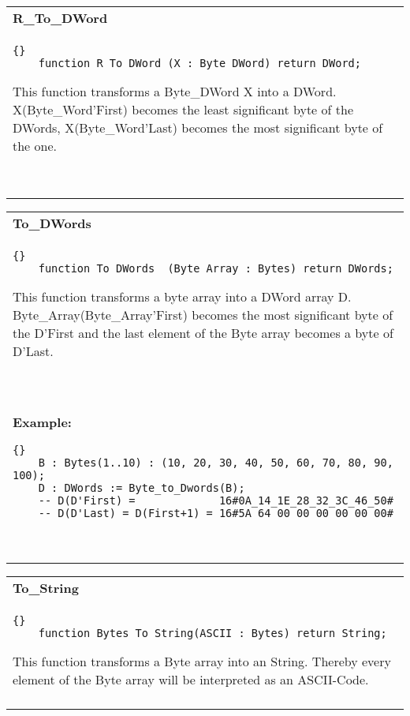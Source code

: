 \begin{tabular}{p{\textwidth}}   
\textbf{R\_To\_DWord}\ \\
  \begin{lstlisting}{}
    function R_To_DWord (X : Byte_DWord) return DWord;  
  \end{lstlisting}
  This function transforms a Byte\_DWord X into a DWord.
  X(Byte\_Word'First) becomes the least significant byte of the DWords,
  X(Byte\_Word'Last) becomes the most significant byte of the one.\\ \ \\
  \hline\\
\end{tabular}


\begin{tabular}{p{\textwidth}}
  \textbf{To\_DWords}\ \\
  \begin{lstlisting}{}
    function To_DWords  (Byte_Array : Bytes) return DWords;
  \end{lstlisting}
  This function transforms a byte array into a DWord array D.
  Byte\_Array(Byte\_Array'First) becomes the most significant byte
  of the D'First and the last element of the Byte array becomes a byte of
  D'Last. \\ \ \\
  \textbf{Example:}
  \begin{lstlisting}{}
    B : Bytes(1..10) : (10, 20, 30, 40, 50, 60, 70, 80, 90, 100);
    D : DWords := Byte_to_Dwords(B);
    -- D(D'First) =             16#0A_14_1E_28_32_3C_46_50#
    -- D(D'Last) = D(First+1) = 16#5A_64_00_00_00_00_00_00#
  \end{lstlisting}\\ \ \\
  \hline\\
\end{tabular}


\begin{tabular}{p{\textwidth}}
  \textbf{To\_String}\ \\
  \begin{lstlisting}{}
    function Bytes_To_String(ASCII : Bytes) return String;
  \end{lstlisting}
  This function transforms a Byte array into an String. Thereby
  every element of the Byte array will be interpreted as an ASCII-Code.\ \ \\
  \hline\\
\end{tabular}\ \\


